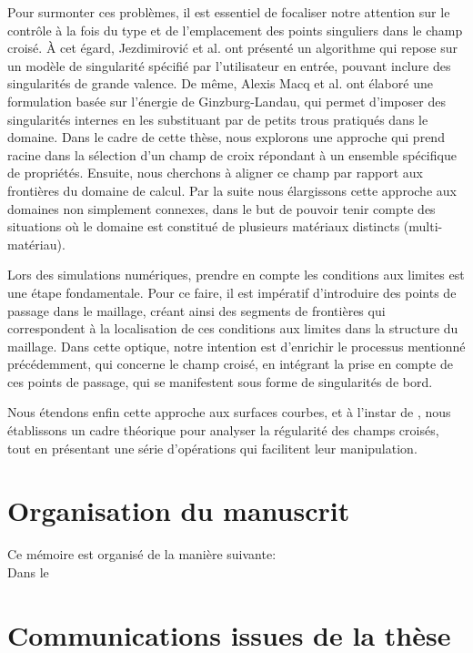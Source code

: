Pour surmonter ces problèmes, il est essentiel de focaliser notre attention sur le contrôle à la fois du type et de l'emplacement des points singuliers dans le champ croisé. À cet égard, Jezdimirović et al. \cite{jezdimirovic2021quad} ont présenté un algorithme qui repose sur un modèle de singularité spécifié par l'utilisateur en entrée, pouvant inclure des singularités de grande valence. De même, Alexis Macq et al. \cite{macq2020ginzburg} ont élaboré une formulation basée sur l'énergie de Ginzburg-Landau, qui permet d'imposer des singularités internes en les substituant par de petits trous pratiqués dans le domaine. Dans le cadre de cette thèse, nous explorons une approche qui prend racine dans la sélection d'un champ de croix répondant à un ensemble spécifique de propriétés. Ensuite, nous cherchons à aligner ce champ par rapport aux frontières du domaine de calcul. Par la suite nous élargissons cette approche aux domaines non simplement connexes, dans le but de pouvoir tenir compte des situations où le domaine est constitué de plusieurs matériaux distincts (multi-matériau).

Lors des simulations numériques, prendre en compte les conditions aux limites est une étape fondamentale. Pour ce faire, il est impératif d'introduire des points de passage dans le maillage, créant ainsi des segments de frontières qui correspondent à la localisation de ces conditions aux limites dans la structure du maillage. Dans cette optique, notre intention est d'enrichir le processus mentionné précédemment, qui concerne le champ croisé, en intégrant la prise en compte de ces points de passage, qui se manifestent sous forme de singularités de bord.

Nous étendons enfin cette approche aux surfaces courbes, et à l'instar de \cite{viertel2019approach}, nous établissons un cadre théorique pour analyser la régularité des champs croisés, tout en présentant une série d'opérations qui facilitent leur manipulation.

\section{Organisation du manuscrit}

 Ce mémoire est organisé de la manière suivante:\\

 Dans le \textbf{\color{blue!50!black}{Chapitre 1}}

\newpage
\section{Communications issues de la thèse}

